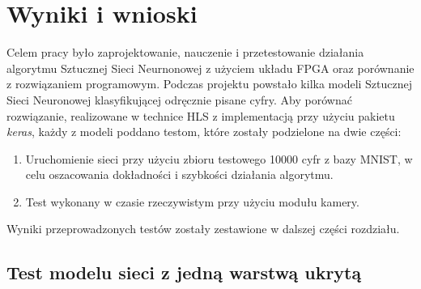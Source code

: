 \newpage %
\cleardoublepage %
\pagestyle{headings}

\section{Wyniki i wnioski}

Celem pracy było zaprojektowanie, nauczenie i przetestowanie działania algorytmu Sztucznej Sieci Neurnonowej z użyciem układu FPGA oraz porównanie z rozwiązaniem programowym. Podczas projektu powstało kilka modeli Sztucznej Sieci Neuronowej klasyfikującej odręcznie pisane cyfry. Aby porównać rozwiązanie, realizowane w technice HLS z implementacją przy użyciu pakietu \emph{keras}, każdy z modeli poddano testom, które zostały podzielone na dwie części:
\bigskip
\begin{enumerate}
  \item Uruchomienie sieci przy użyciu zbioru testowego 10000 cyfr z bazy MNIST, w celu oszacowania dokładności i szybkości działania algorytmu.
  \item Test wykonany w czasie rzeczywistym przy użyciu modułu kamery.
\end{enumerate}

Wyniki przeprowadzonych testów zostały zestawione w dalszej części rozdziału.

\subsection{Test modelu sieci z jedną warstwą ukrytą}




